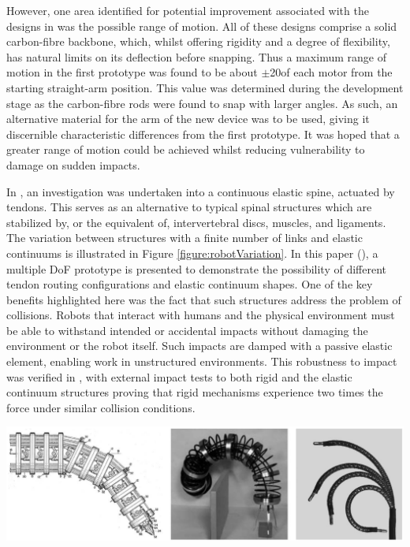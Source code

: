 \documentclass[11pt]{article}
\begin{document}
However, one area identified for potential improvement associated with the designs in \cite{godage2011}\cite{zhang2011}\cite{GreggSmithDesign} was the possible range of motion. All of these designs comprise a solid carbon-fibre backbone, which, whilst offering rigidity and a degree of flexibility, has natural limits on its deflection before snapping. Thus a maximum range of motion in the first prototype was found to be about $\pm$20\degree of each motor from the starting straight-arm position. This value was determined during the development stage as the carbon-fibre rods were found to snap with larger angles. As such, an alternative material for the arm of the new device was to be used, giving it discernible characteristic differences from the first prototype. It was hoped that a greater range of motion could be achieved whilst reducing vulnerability to damage on sudden impacts.

In \cite{reinecke2016}, an investigation was undertaken into a continuous elastic spine, actuated by tendons. This serves as an alternative to typical spinal structures which are stabilized by, or the equivalent of, intervertebral discs, muscles, and ligaments. The variation between structures with a finite number of links and elastic continuums is illustrated in Figure \ref{figure:robotVariation}. In this paper (\cite{reinecke2016}), a multiple DoF prototype is presented to demonstrate the possibility of different tendon routing configurations and elastic continuum shapes. One of the key benefits highlighted here was the fact that such structures address the problem of collisions. Robots that interact with humans and the physical environment must be able to withstand intended or accidental impacts without damaging the environment or the robot itself. Such impacts are damped with a passive elastic element, enabling work in unstructured environments. This robustness to impact was verified in \cite{reinecke2016}, with external impact tests to both rigid and the elastic continuum structures proving that rigid mechanisms experience two times the force under similar collision conditions.

\begin{center}
\includegraphics[width=\textwidth]{images/robotVariation.png}
\label{figure:robotVariation}
\end{center}
\end{document}
